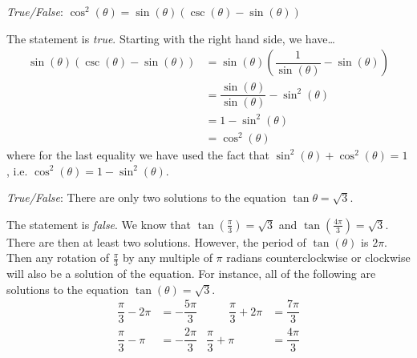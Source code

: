 \documentclass[11pt,letterpaper]{article}
\begin{document}
\newpage



\quizsol \textit{True/False}: $\cos^2(\theta)= \sin(\theta) \left( \csc(\theta) - \sin(\theta) \right)$ \pspace

\sol The statement is \textit{true}. Starting with the right hand side, we have\dots
	\[
	\begin{aligned}
	 \sin(\theta) \left( \csc(\theta) - \sin(\theta) \right)&=  \sin(\theta) \left( \dfrac{1}{\sin(\theta)} - \sin(\theta) \right) \\[0.3cm]
	 &= \dfrac{\sin(\theta)}{\sin(\theta)} - \sin^2(\theta) \\[0.3cm]
	 &= 1 - \sin^2(\theta) \\[0.3cm]
	 &= \cos^2(\theta)
	\end{aligned}
	\]
where for the last equality we have used the fact that $\sin^2(\theta) + \cos^2(\theta)= 1$, i.e. $\cos^2(\theta)= 1 - \sin^2(\theta)$. \pvspace{1.3cm}



\quizsol \textit{True/False}: There are only two solutions to the equation $\tan \theta= \sqrt{3}$. \pspace

\sol The statement is \textit{false}. We know that $\tan \left( \frac{\pi}{3} \right)= \sqrt{3}$ and $\tan \left( \frac{4\pi}{3} \right)= \sqrt{3}$. There are then at least two solutions. However, the period of $\tan(\theta)$ is $2\pi$. Then any rotation of $\frac{\pi}{3}$ by any multiple of $\pi$ radians counterclockwise or clockwise will also be a solution of the equation. For instance, all of the following are solutions to the equation $\tan(\theta)= \sqrt{3}$. 
	\[
	\begin{aligned}
	\dfrac{\pi}{3} - 2 \pi&= -\dfrac{5\pi}{3} &\qquad \dfrac{\pi}{3} + 2\pi&= \dfrac{7\pi}{3} \\[0.3cm]
	\dfrac{\pi}{3} - \pi&= -\dfrac{2\pi}{3} & \dfrac{\pi}{3} + \pi&= \dfrac{4\pi}{3}
	\end{aligned}
	\]
\end{document}
